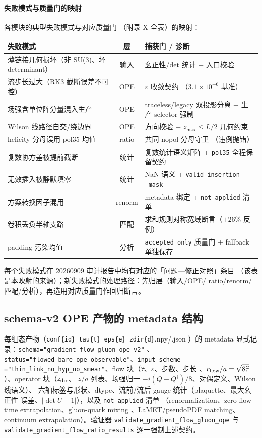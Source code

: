 \documentclass[11pt,a4paper]{ctexart}
\newcommand{\eps}{\varepsilon}
\newcommand{\abs}[1]{\lvert #1\rvert}
\newcommand{\code}[1]{\texttt{#1}}
\newcommand{\zzh}{\widehat{\tau}}
\begin{document}
\paragraph{失败模式与质量门的映射}各模块的典型失败模式与对应质量门
（附录 X 全表）的映射：

\begin{center}
\footnotesize
\begin{tabular}{p{} c p{}}
\toprule
\textbf{失败模式} & \textbf{层} & \textbf{捕获门 / 诊断} \\
\midrule
薄链接几何损坏（非 SU(3)、坏 determinant） & 输入 & 幺正性/det
统计 + 入口校验 \\
流步长过大（RK3 截断误差不可控） & OPE & $\eps$ 收敛契约
（$3.1\times10^{-6}$ 基准） \\
场强含单位阵分量混入生产 & OPE & traceless/legacy 双投影分离 +
生产 selector 强制 \\
Wilson 线路径自交/绕边界 & OPE & 方向校验 + $z_{\max}\le L/2$
几何约束 \\
helicity 分母误用 pol35 均值 & ratio & 共同 nopol 分母守卫
（违例抛错） \\
复数协方差被提前截断 & 统计 & 复数统计语义矩阵 +
\code{pol35} 全程保留契约 \\
无效插入被静默填零 & 统计 & NaN 语义 + \code{valid\_insertion
\_mask} \\
方案转换因子混用 & renorm & metadata 绑定 + \code{not\_applied}
清单 \\
卷积丢负半轴支路 & 匹配 & 求和规则对称宽域断言（$+26\%$ 反例） \\
padding 污染均值 & 分析 & \code{accepted\_only} 质量门 +
fallback 单独保存 \\
\bottomrule
\end{tabular}
\end{center}
每个失败模式在 20260909 审计报告中均有对应的「问题—修正对照」条目
（该表是本映射的来源）；新失败模式的处理路径：先归层（输入/OPE/
ratio/renorm/匹配/分析），再选用对应质量门作回归断言。

\subsection{schema-v2 OPE 产物的 metadata 结构}

每组态产物（\code{conf\{id\}\_tau\{t\}\_eps\{e\}\_zdir\{d\}}.npy/.json
）的 metadata 显式记录：\code{schema="gradient\_flow\_gluon\_ope\_v2"}
、\code{status="flowed\_bare\_ope\_observable"}、\code{input\_scheme
="thin\_link\_no\_hyp\_no\_smear"}、flow 块（$\zzh$、$\eps$、步数、步长
、$r_{\rm flow}/a=\sqrt{8\zzh}$）、operator 块（$z_{\rm dir}$、
$z/a$ 列表、场强归一 $-i(Q-Q^\dagger)/8$、对偶定义、Wilson 线语义）、
六轴标签与形状、dtype、流前/流后 gauge 统计（plaquette、最大幺正性
误差、$\abs{\det U-1}$），以及 \code{not\_applied} 清单
（renormalization、zero-flow-time extrapolation、gluon-quark mixing
、LaMET/pseudoPDF matching、continuum extrapolation）。验证器
\code{validate\_gradient\_flow\_gluon\_ope} 与
\code{validate\_gradient\_flow\_ratio\_results} 逐一强制上述契约。
\end{document}
